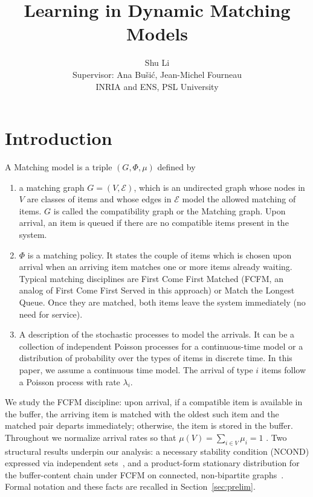 \documentclass[11pt]{article}
\title{Learning in Dynamic Matching Models}
\author{Shu Li \\
        Supervisor:  Ana Bu\v{s}i\'{c}, Jean-Michel Fourneau\\
        INRIA and ENS, PSL University}
\date{}
\newcommand{\fcfm}{\textsc{FCFM}}
\newcommand{\ncond}{\textsc{NCOND}}
\begin{document}
\maketitle
\section{Introduction}\label{sec:intro}

A Matching model is  a triple $( G, \Phi, \mu) $ defined by 
\begin{enumerate}
	\item a matching graph $G=({V},\mathcal{E})$, which is an undirected graph whose nodes in ${V}$ are classes of items 
	and whose edges in $\mathcal{E}$ model the allowed matching of items. $G$ is called the compatibility graph or the Matching graph. Upon arrival, an item is queued if there are no 
	compatible items present in the system.
	
	\item $\Phi$ is a matching policy. It states the couple of items which is chosen
	upon arrival when an arriving item 
	matches one or more items already waiting. Typical matching disciplines are First Come First Matched (FCFM, an analog of First Come First Served in this approach) or Match the Longest Queue. 
	Once they are matched, both items leave the system immediately (no need for service). 
	\item A description of the stochastic processes to 
	model the arrivals. It can be 
	a collection of independent Poisson processes for
	a continuous-time model or a
	distribution of probability over the types of items in discrete time.  In this paper, we assume a continuous time model. 
	The arrival of type $i$ items follow a Poisson process
	with rate $\lambda_i$.  
\end{enumerate} 

We study the FCFM  discipline: upon arrival, if a compatible item is available in the buffer, the arriving item is matched with the oldest such item and the matched pair departs immediately; otherwise, the item is stored in the buffer. Throughout we normalize arrival rates so that $\mu(V)=\sum_{i\in V}\mu_i=1$ . Two structural results underpin our analysis: a necessary stability condition (\ncond) expressed via independent sets~\cite{MaMo18}, and a product-form stationary distribution for the buffer-content chain under {\fcfm}  on connected, non-bipartite graphs~\cite{MBMa21}. Formal notation and these facts are recalled in Section~\ref{sec:prelim}.
\end{document}
